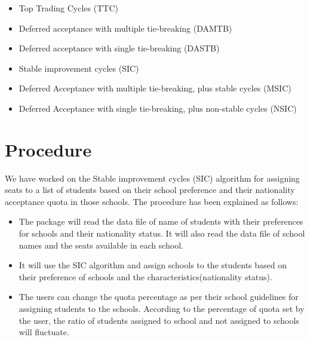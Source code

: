 \documentclass[twocolumn]{bmcart}
\begin{document}
	\begin{sloppypar}
		\begin{itemize}
			\vspace{-0.4cm}\item Top Trading Cycles (TTC) \vspace{\baselineskip}
			\vspace{-0.4cm}\item Deferred acceptance with multiple tie-breaking (DAMTB) \vspace{\baselineskip}
			\vspace{-0.4cm}\item Deferred acceptance with single tie-breaking (DASTB) \vspace{\baselineskip}
			\vspace{-0.4cm}\item Stable improvement cycles (SIC) \vspace{\baselineskip}
			\vspace{-0.4cm}\item Deferred Acceptance with multiple tie-breaking, plus stable cycles (MSIC) \vspace{\baselineskip}
			\vspace{-0.4cm}\item Deferred Acceptance with single tie-breaking, plus non-stable cycles (NSIC)
		\end{itemize}
	\end{sloppypar}
	\section*{Procedure}
	\vspace{\baselineskip}
	We have worked on the Stable improvement cycles (SIC) algorithm for assigning seats to a list of students based on their school preference and their nationality acceptance quota in those schools. The procedure has been explained as follows: \vspace{\baselineskip}
	\vspace{\baselineskip}
	\begin{itemize}
		\vspace{-0.4cm}\item The package will read the data file of name of students with their preferences for schools and their nationality status. It will also read the data file of school names and the seats available in each school. \vspace{\baselineskip}
		\vspace{-0.4cm}\item It will use the SIC algorithm and assign schools to the students based on their preference of schools and the characteristics(nationality status). \vspace{\baselineskip}
		\vspace{-0.4cm}\item The users can change the quota percentage as per their school guidelines for assigning students to the schools. According to the percentage of quota set by the user, the ratio of students assigned to school and not assigned to schools will fluctuate. \vspace{\baselineskip}
	\end{itemize}
	
\end{document}
